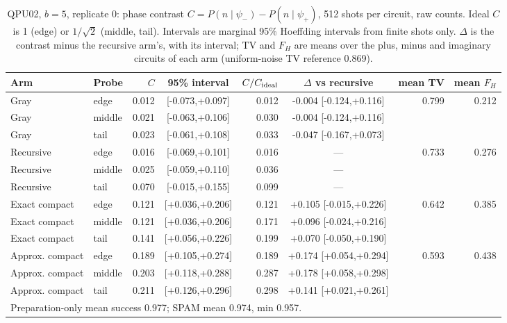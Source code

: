 \begin{table}[htbp]\centering\scriptsize\setlength{\tabcolsep}{3pt}
\caption{QPU02, $b=5$, replicate 0: phase contrast $C=P(n\mid\psi_-)-P(n\mid\psi_+)$, 512 shots per circuit, raw counts. Ideal $C$ is 1 (edge) or $1/\sqrt2$ (middle, tail). Intervals are marginal 95\% Hoeffding intervals from finite shots only. $\Delta$ is the contrast minus the recursive arm's, with its interval; TV and $F_H$ are means over the plus, minus and imaginary circuits of each arm (uniform-noise TV reference 0.869).}\label{tab:q2c-b5r0}
\begin{tabular}{llrcrcrr}\toprule Arm & Probe & $C$ & 95\% interval & $C/C_{\rm ideal}$ & $\Delta$ vs recursive & mean TV & mean $F_H$\\\midrule
Gray & edge & 0.012 & [-0.073,+0.097] & 0.012 & -0.004 [-0.124,+0.116] & 0.799 & 0.212\\
Gray & middle & 0.021 & [-0.063,+0.106] & 0.030 & -0.004 [-0.124,+0.116] &  & \\
Gray & tail & 0.023 & [-0.061,+0.108] & 0.033 & -0.047 [-0.167,+0.073] &  & \\
\midrule
Recursive & edge & 0.016 & [-0.069,+0.101] & 0.016 & --- & 0.733 & 0.276\\
Recursive & middle & 0.025 & [-0.059,+0.110] & 0.036 & --- &  & \\
Recursive & tail & 0.070 & [-0.015,+0.155] & 0.099 & --- &  & \\
\midrule
Exact compact & edge & 0.121 & [+0.036,+0.206] & 0.121 & +0.105 [-0.015,+0.226] & 0.642 & 0.385\\
Exact compact & middle & 0.121 & [+0.036,+0.206] & 0.171 & +0.096 [-0.024,+0.216] &  & \\
Exact compact & tail & 0.141 & [+0.056,+0.226] & 0.199 & +0.070 [-0.050,+0.190] &  & \\
\midrule
Approx. compact & edge & 0.189 & [+0.105,+0.274] & 0.189 & +0.174 [+0.054,+0.294] & 0.593 & 0.438\\
Approx. compact & middle & 0.203 & [+0.118,+0.288] & 0.287 & +0.178 [+0.058,+0.298] &  & \\
Approx. compact & tail & 0.211 & [+0.126,+0.296] & 0.298 & +0.141 [+0.021,+0.261] &  & \\
\multicolumn{8}{l}{Preparation-only mean success 0.977; SPAM mean 0.974, min 0.957.}\\
\bottomrule\end{tabular}\end{table}

